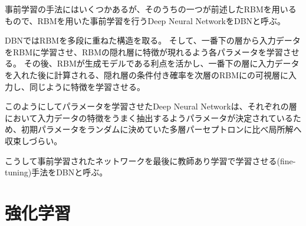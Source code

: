 事前学習の手法にはいくつかあるが、そのうちの一つが前述したRBMを用いるもので、RBMを用いた事前学習を行うDeep Neural NetworkをDBNと呼ぶ。

DBNではRBMを多段に重ねた構造を取る。
そして、一番下の層から入力データをRBMに学習させ、RBMの隠れ層に特徴が現れるよう各パラメータを学習させる。
その後、RBMが生成モデルである利点を活かし、一番下の層に入力データを入れた後に計算される、隠れ層の条件付き確率を次層のRBMにの可視層に入力し、同じように特徴を学習させる。

このようにしてパラメータを学習させたDeep Neural Networkは、それぞれの層において入力データの特徴をうまく抽出するようパラメータが決定されているため、初期パラメータをランダムに決めていた多層パーセプトロンに比べ局所解へ収束しづらい。

こうして事前学習されたネットワークを最後に教師あり学習で学習させる(fine-tuning)手法をDBNと呼ぶ。

\section{強化学習}
